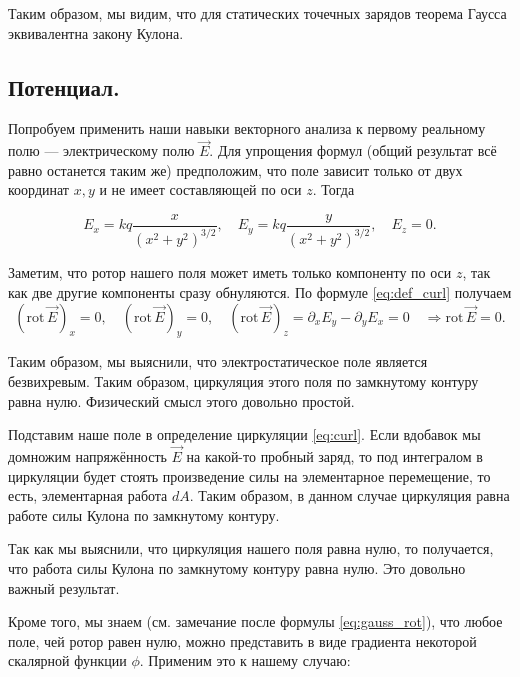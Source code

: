 \documentclass[12pt,a4paper]{article}
\numberwithin{equation}{section}
\numberwithin{equation}{section}
\newcommand{\pt}{\partial}
\newcommand{\rot}{\mathrm{rot}\,}
\begin{document}
Таким образом, мы видим, что для статических точечных зарядов теорема
Гаусса эквивалентна закону Кулона. 

\subsection{Потенциал.}
\label{sec:potential}

Попробуем применить наши навыки векторного анализа к первому реальному
полю --- электрическому полю $\vec{E}$. Для упрощения формул (общий
результат всё равно останется таким же) предположим, что поле зависит
только от двух координат $x,y$ и не имеет составляющей по оси
$z$. Тогда

\begin{equation}
  \label{eq:rot_electrostatics_1}
  E_x = kq \frac{x}{(x^2+y^2)^{3/2}}, \quad   E_y = kq
  \frac{y}{(x^2+y^2)^{3/2}}, \quad E_z =0. 
\end{equation}

Заметим, что ротор нашего поля может иметь только компоненту по оси
$z$, так как две другие компоненты сразу обнуляются. По формуле
\eqref{eq:def_curl} получаем
\begin{equation}
  \label{eq:rot_electrostatics_2}
 \left( \rot \vec{E} \right)_x =0, \quad  \left( \rot \vec{E}
 \right)_y =0, \quad \left( \rot \vec{E} \right)_z = \pt_x E_y - \pt_y
 E_x = 0 \quad \Rightarrow \rot \vec{E} =0.
\end{equation}

Таким образом, мы выяснили, что электростатическое поле является
безвихревым. Таким образом, циркуляция этого поля по замкнутому
контуру равна нулю. Физический смысл этого довольно простой. 

Подставим наше поле в определение циркуляции \eqref{eq:curl}. Если
вдобавок мы домножим напряжённость $\vec{E}$ на какой-то пробный
заряд, то под интегралом в циркуляции будет стоять произведение силы
на элементарное перемещение, то есть, элементарная работа $dA$. Таким
образом, в данном случае циркуляция равна работе силы Кулона по
замкнутому контуру. 

Так как мы выяснили, что циркуляция нашего поля равна нулю, то
получается, что работа силы Кулона по замкнутому контуру равна
нулю. Это довольно важный результат. 

Кроме того, мы знаем (см. замечание после формулы
\eqref{eq:gauss_rot}), что любое поле, чей ротор равен нулю, можно
представить в виде градиента некоторой скалярной функции
$\phi$. Применим это к нашему случаю:
\end{document}
